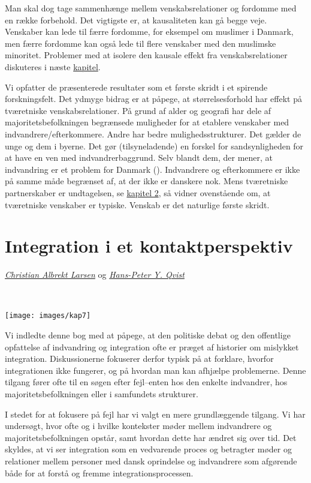 \documentclass[
]{book}
\begin{document}
Man skal dog tage sammenhænge mellem venskabsrelationer og fordomme med en række forbehold. Det vigtigste er, at kausaliteten kan gå begge veje. Venskaber kan lede til færre fordomme, for eksempel om muslimer i Danmark, men færre fordomme kan også lede til flere venskaber med den muslimske minoritet. Problemer med at isolere den kausale effekt fra venskabsrelationer diskuteres i næste \hyperref[kap7]{kapitel}.

Vi opfatter de præsenterede resultater som et første skridt i et spirende forskningsfelt. Det ydmyge bidrag er at påpege, at størrelsesforhold har effekt på tværetniske venskabsrelationer. På grund af alder og geografi har dele af majoritetsbefolkningen begrænsede muligheder for at etablere venskaber med indvandrere/efterkommere. Andre har bedre mulighedsstrukturer. Det gælder de unge og dem i byerne. Det gør (tilsyneladende) en forskel for sandsynligheden for at have en ven med indvandrerbaggrund. Selv blandt dem, der mener, at indvandring er et problem for Danmark (). Indvandrere og efterkommere er ikke på samme måde begrænset af, at der ikke er danskere nok. Mens tværetniske partnerskaber er undtagelsen, se \hyperref[kap2]{kapitel 2}, så vidner ovenstående om, at tværetniske venskaber er typiske. Venskab er det naturlige første skridt.

\chapter{Integration i et kontaktperspektiv}\label{kap7}

\thispagestyle{empty}

\emph{\href{https://vbn.aau.dk/en/persons/albrekt}{Christian Albrekt Larsen}} og \emph{\href{https://vbn.aau.dk/en/persons/hpq}{Hans-Peter Y. Qvist}}

~~~~

\texttt{[image: images/kap7]}

\newpage

Vi indledte denne bog med at påpege, at den politiske debat og den offentlige opfattelse af indvandring og integration ofte er præget af historier om mislykket integration. Diskussionerne fokuserer derfor typisk på at forklare, hvorfor integrationen ikke fungerer, og på hvordan man kan afhjælpe problemerne. Denne tilgang fører ofte til en søgen efter fejl--enten hos den enkelte indvandrer, hos majoritetsbefolkningen eller i samfundets strukturer.

I stedet for at fokusere på fejl har vi valgt en mere grundlæggende tilgang. Vi har undersøgt, hvor ofte og i hvilke kontekster møder mellem indvandrere og majoritetsbefolkningen opstår, samt hvordan dette har ændret sig over tid. Det skyldes, at vi ser integration som en vedvarende proces og betragter møder og relationer mellem personer med dansk oprindelse og indvandrere som afgørende både for at forstå og fremme integrationsprocessen.
\end{document}

